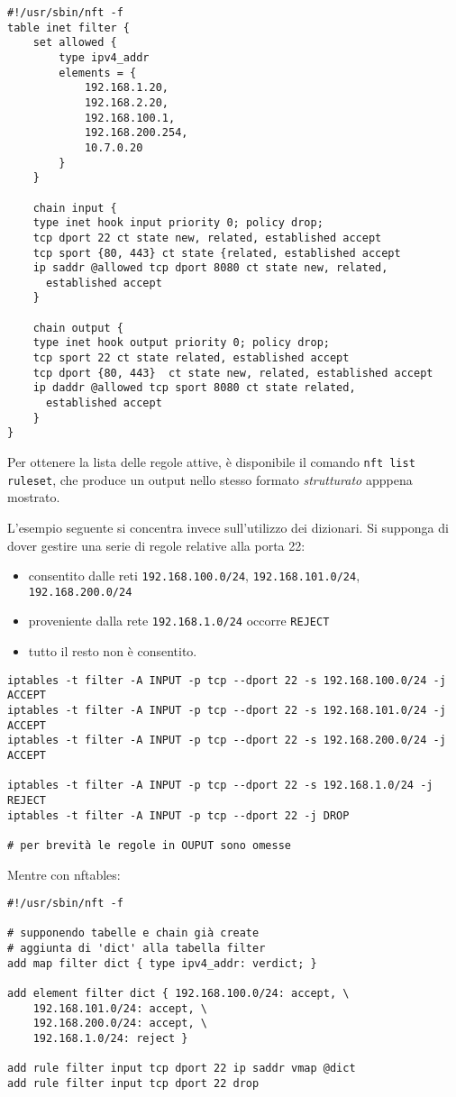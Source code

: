 \begin{verbatim}
#!/usr/sbin/nft -f
table inet filter {
	set allowed {
		type ipv4_addr
		elements = {
			192.168.1.20,
			192.168.2.20,
			192.168.100.1,
			192.168.200.254,
			10.7.0.20
		}
	}
		
	chain input {
    type inet hook input priority 0; policy drop;
    tcp dport 22 ct state new, related, established accept
    tcp sport {80, 443} ct state {related, established accept
    ip saddr @allowed tcp dport 8080 ct state new, related,
      established accept
	}
			
	chain output {
    type inet hook output priority 0; policy drop;
    tcp sport 22 ct state related, established accept
    tcp dport {80, 443}  ct state new, related, established accept
    ip daddr @allowed tcp sport 8080 ct state related,
      established accept
	}
}
	\end{verbatim}
	Per ottenere la lista delle regole attive, è disponibile il comando
	\texttt{nft list ruleset}, che produce un output nello stesso formato \textit{strutturato}
	apppena mostrato.
	
	L'esempio seguente si concentra invece sull'utilizzo dei dizionari.
	Si supponga di dover gestire una serie di regole relative alla porta 22:
	\begin{itemize}
		\item consentito dalle reti \texttt{192.168.100.0/24}, \texttt{192.168.101.0/24},
		      \texttt{192.168.200.0/24}
		\item proveniente dalla rete \texttt{192.168.1.0/24} occorre \texttt{REJECT}
		\item tutto il resto non è consentito.
	\end{itemize}
\begin{verbatim}
iptables -t filter -A INPUT -p tcp --dport 22 -s 192.168.100.0/24 -j ACCEPT
iptables -t filter -A INPUT -p tcp --dport 22 -s 192.168.101.0/24 -j ACCEPT
iptables -t filter -A INPUT -p tcp --dport 22 -s 192.168.200.0/24 -j ACCEPT
		
iptables -t filter -A INPUT -p tcp --dport 22 -s 192.168.1.0/24 -j REJECT
iptables -t filter -A INPUT -p tcp --dport 22 -j DROP
		
# per brevità le regole in OUPUT sono omesse
\end{verbatim}
	Mentre con nftables:
\begin{verbatim}
#!/usr/sbin/nft -f
		
# supponendo tabelle e chain già create
# aggiunta di 'dict' alla tabella filter
add map filter dict { type ipv4_addr: verdict; }
		
add element filter dict { 192.168.100.0/24: accept, \
	192.168.101.0/24: accept, \
	192.168.200.0/24: accept, \
	192.168.1.0/24: reject }
		
add rule filter input tcp dport 22 ip saddr vmap @dict
add rule filter input tcp dport 22 drop
\end{verbatim}
